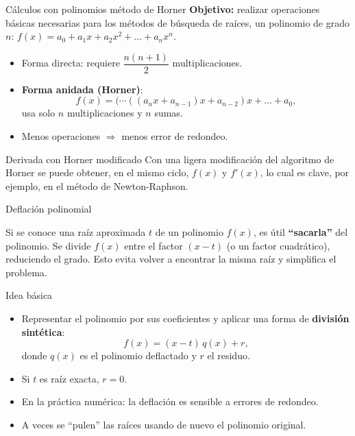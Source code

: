 \documentclass[../../main.tex]{subfiles}
\begin{document}
\begin{frame}{Cálculos con polinomios método de Horner}
  \textbf{Objetivo:} realizar operaciones básicas necesarias para los métodos de búsqueda de raíces, un polinomio de grado \(n\):      
    \(
      f(x) = a_0 + a_1 x + a_2 x^2 + \dots + a_n x^n.
    \)
    \begin{itemize}
      \item Forma directa: requiere \(\dfrac{n(n+1)}{2}\) multiplicaciones.
      \item \textbf{Forma anidada (Horner)}:
      \[
        f(x) = (\cdots((a_n x + a_{n-1})x + a_{n-2})x + \dots + a_0,
      \]
      usa solo \(n\) multiplicaciones y \(n\) sumas.
      \item Menos operaciones \(\Rightarrow\) menos error de redondeo.
    \end{itemize}
   \begin{block}{Derivada con Horner modificado}
    Con una ligera modificación del algoritmo de Horner se puede obtener, en el mismo ciclo,
    \(f(x)\) y \(f'(x)\), lo cual es clave, por ejemplo, en el método de Newton-Raphson.
  \end{block}
\end{frame}

\begin{frame}{Deflación polinomial}
  
Si se conoce una raíz aproximada \(t\) de un polinomio \(f(x)\), es útil \textbf{“sacarla”} del polinomio. Se divide \(f(x)\) entre el factor \((x - t)\) (o un factor cuadrático), reduciendo el grado. Esto evita volver a encontrar la misma raíz y simplifica el problema.
 
  \begin{block}{Idea básica}
    \begin{itemize}
      \item Representar el polinomio por sus coeficientes y aplicar una forma de \textbf{división sintética}:
        \[
          f(x) = (x - t)\,q(x) + r,
        \]
        donde \(q(x)\) es el polinomio deflactado y \(r\) el residuo.
      \item Si \(t\) es raíz exacta, \(r = 0\).
    \end{itemize}
  \end{block}

  \begin{itemize}
    \item En la práctica numérica: la deflación es sensible a errores de redondeo.
    \item A veces se “pulen” las raíces usando de nuevo el polinomio original.
  \end{itemize}
\end{frame}
\end{document}

